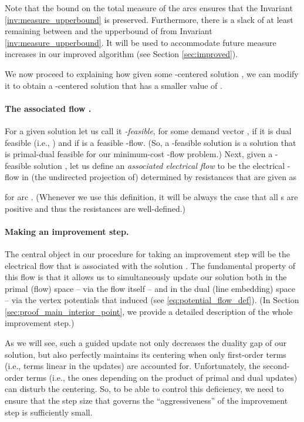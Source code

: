 \documentclass[11pt, letterpaper]{article}
\begin{document}
Note that the bound on the total measure of the arcs ensures that the Invariant \ref{inv:measure_upperbound} is preserved. Furthermore, there is a slack of at least  remaining between  and the upperbound of  from Invariant \ref{inv:measure_upperbound}. It will be used to accommodate future measure increases in our improved algorithm (see Section \ref{sec:improved}).  

We now proceed to explaining how given some -centered solution , we can modify it to obtain a -centered solution  that has a smaller value of . 

\paragraph{The associated flow .} For a given solution  let us call it {\em -feasible}, for some demand vector , if it is dual feasible (i.e., ) and if  is a feasible -flow. (So, a -feasible solution is a solution that is primal-dual feasible for our minimum-cost -flow problem.) Next, given a -feasible solution , let us define an {\em associated electrical flow } to be the electrical -flow in (the undirected projection of)  determined by resistances  that are given as

for arc . (Whenever we use this definition, it will be always the case that all s are positive and thus the resistances  are well-defined.)

 \paragraph{Making an improvement step.} The central object in our procedure for taking an improvement step will be the electrical flow  that is associated with the solution . The fundamental property of this flow is that it allows us to simultaneously update our solution  {both} in the primal (flow) space -- via the flow  itself -- and in the dual (line embedding) space -- via the vertex potentials  that induced  (see \eqref{eq:potential_flow_def}). (In Section \ref{sec:proof_main_interior_point}, we provide a detailed description of the whole improvement step.)

 As we will see, such a guided update not only decreases the duality gap of our solution, but also perfectly maintains its centering when only first-order terms (i.e., terms linear in the updates) are accounted for. Unfortunately, the second-order terms (i.e., the ones depending on the product of primal and dual updates) can disturb the centering. So, to be able to control this deficiency, we need to ensure that the step size  that governs the ``aggressiveness'' of the improvement step is sufficiently small. 
 
\end{document}
